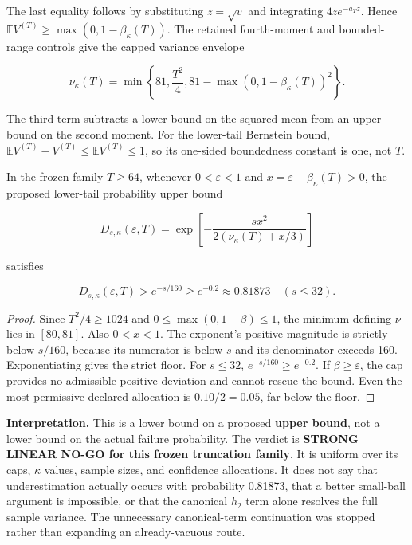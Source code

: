 The last equality follows by substituting $z=\sqrt v$ and integrating $4ze^{-a_Tz}$. Hence $\mathbb EV^{(T)}\ge\max(0,1-\beta_\kappa(T))$. The retained fourth-moment and bounded-range controls give the capped variance envelope


\begin{equation}
\nu_\kappa(T)=\min\left\{81,\frac{T^2}{4},
81-\max(0,1-\beta_\kappa(T))^2\right\}.
\end{equation}


The third term subtracts a lower bound on the squared mean from an upper bound on the second moment. For the lower-tail Bernstein bound, $\mathbb EV^{(T)}-V^{(T)}\le\mathbb EV^{(T)}\le1$, so its one-sided boundedness constant is one, not $T$.


\begin{proposition}\label{thm:T12}
In the frozen family $T\ge64$, whenever $0<\varepsilon<1$ and $x=\varepsilon-\beta_\kappa(T)>0$, the proposed lower-tail probability upper bound


\begin{equation}
D_{s,\kappa}(\varepsilon,T)
=\exp\!\left[-\frac{sx^2}{2(\nu_\kappa(T)+x/3)}\right]
\end{equation}


satisfies


\begin{equation}
\boxed{D_{s,\kappa}(\varepsilon,T)>e^{-s/160}
\ge e^{-0.2}\approx0.81873\quad(s\le32).}
\end{equation}


\end{proposition}
\begin{proof}
Since $T^2/4\ge1024$ and $0\le\max(0,1-\beta)\le1$, the minimum defining $\nu$ lies in $[80,81]$. Also $0<x<1$. The exponent's positive magnitude is strictly below $s/160$, because its numerator is below $s$ and its denominator exceeds 160. Exponentiating gives the strict floor. For $s\le32$, $e^{-s/160}\ge e^{-0.2}$. If $\beta\ge\varepsilon$, the cap provides no admissible positive deviation and cannot rescue the bound. Even the most permissive declared allocation is $0.10/2=0.05$, far below the floor.

\end{proof}


\textbf{Interpretation.} This is a lower bound on a proposed \textbf{upper bound}, not a lower bound on the actual failure probability. The verdict is \textbf{STRONG LINEAR NO-GO for this frozen truncation family}. It is uniform over its caps, $\kappa$ values, sample sizes, and confidence allocations. It does not say that underestimation actually occurs with probability 0.81873, that a better small-ball argument is impossible, or that the canonical $h_2$ term alone resolves the full sample variance. The unnecessary canonical-term continuation was stopped rather than expanding an already-vacuous route.


